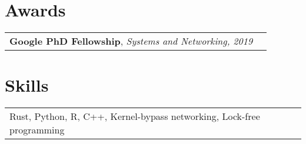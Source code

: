 \documentclass[margin,line]{res}
\begin{document}
\begin{resume}
\section{\sc Awards}
\begin{tabular}{@{}p{5.5in}p{4in}}
{\bf Google PhD Fellowship}, {\small\em Systems and Networking, 2019}\\
\end{tabular}

\section{\sc Skills}
\begin{tabular}{@{}p{5.5in}p{4in}}
Rust, Python, R, C++, Kernel-bypass networking, Lock-free programming
\end{tabular}

\end{resume}
\end{document}
